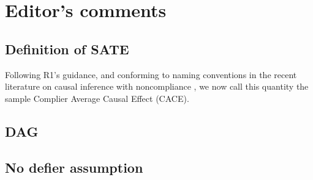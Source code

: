 \documentclass[hidelinks,12pt,letterpaper]{article}
\begin{document}
 


\tableofcontents

\pagebreak
{}%

\section{Editor's comments}

\subsection{Definition of SATE}

Following R1's guidance, and conforming to naming conventions in the recent literature on causal inference with noncompliance \citep{yau2001inference,frumento2012evaluating}, we now call this quantity the sample Complier Average Causal Effect (CACE). 

\subsection{DAG}



\subsection{No defier assumption}
\end{document}
